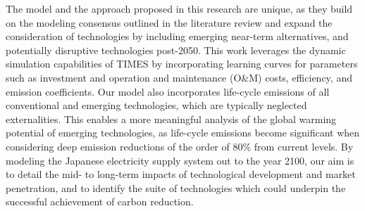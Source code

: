 The model and the approach proposed in this research are unique, as they build on the modeling consensus outlined in the literature review and expand the consideration of technologies by including emerging near-term alternatives, and potentially disruptive technologies post-2050. This work leverages the dynamic simulation capabilities of \gls{TIMES} \cite{loulou_etsap-tiam_2008} by incorporating learning curves for parameters such as investment and operation and maintenance (O\&M) costs, efficiency, and emission coefficients. Our model also incorporates life-cycle emissions of all conventional and emerging technologies, which are typically neglected externalities. This enables a more meaningful analysis of the global warming potential of emerging technologies, as life-cycle emissions become significant when considering deep emission reductions of the order of 80\% from current levels. By modeling the Japanese electricity supply system out to the year 2100, our aim is to detail the mid- to long-term impacts of technological development and market penetration, and to identify the suite of technologies which could underpin the successful achievement of carbon reduction.
